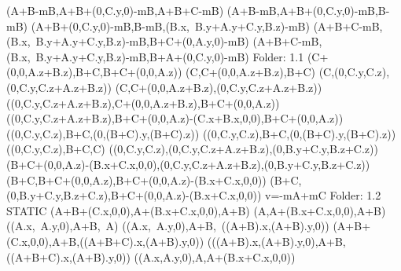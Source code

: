 \left(A+B-mB,A+B+\left(0,C.y,0\right)-mB,A+B+C-mB\right)
\left(A+B-mB,A+B+\left(0,C.y,0\right)-mB,B-mB\right)
\left(A+B+\left(0,C.y,0\right)-mB,B-mB,\left(B.x,\ B.y+A.y+C.y,B.z\right)-mB\right)
\left(A+B+C-mB,\left(B.x,\ B.y+A.y+C.y,B.z\right)-mB,B+C+\left(0,A.y,0\right)-mB\right)
\left(A+B+C-mB,\left(B.x,\ B.y+A.y+C.y,B.z\right)-mB,B+A+\left(0,C.y,0\right)-mB\right)
Folder: 1.1
\left(C+\left(0,0,A.z+B.z\right),B+C,B+C+\left(0,0,A.z\right)\right)
\left(C,C+\left(0,0,A.z+B.z\right),B+C\right)
\left(C,\left(0,C.y,C.z\right),\left(0,C.y,C.z+A.z+B.z\right)\right)
\left(C,C+\left(0,0,A.z+B.z\right),\left(0,C.y,C.z+A.z+B.z\right)\right)
\left(\left(0,C.y,C.z+A.z+B.z\right),C+\left(0,0,A.z+B.z\right),B+C+\left(0,0,A.z\right)\right)
\left(\left(0,C.y,C.z+A.z+B.z\right),B+C+\left(0,0,A.z\right)-\left(C.x+B.x,0,0\right),B+C+\left(0,0,A.z\right)\right)
\left(\left(0,C.y,C.z\right),B+C,\left(0,\left(B+C\right).y,\left(B+C\right).z\right)\right)
\left(\left(0,C.y,C.z\right),B+C,\left(0,\left(B+C\right).y,\left(B+C\right).z\right)\right)
\left(\left(0,C.y,C.z\right),B+C,C\right)
\left(\left(0,C.y,C.z\right),\left(0,C.y,C.z+A.z+B.z\right),\left(0,B.y+C.y,B.z+C.z\right)\right)
\left(B+C+\left(0,0,A.z\right)-\left(B.x+C.x,0,0\right),\left(0,C.y,C.z+A.z+B.z\right),\left(0,B.y+C.y,B.z+C.z\right)\right)
\left(B+C,B+C+\left(0,0,A.z\right),B+C+\left(0,0,A.z\right)-\left(B.x+C.x,0,0\right)\right)
\left(B+C,\left(0,B.y+C.y,B.z+C.z\right),B+C+\left(0,0,A.z\right)-\left(B.x+C.x,0,0\right)\right)
v=-mA+mC
Folder: 1.2 STATIC
\left(A+B+\left(C.x,0,0\right),A+\left(B.x+C.x,0,0\right),A+B\right)
\left(A,A+\left(B.x+C.x,0,0\right),A+B\right)
\left(\left(A.x,\ A.y,0\right),A+B,\ A\right)
\left(\left(A.x,\ A.y,0\right),A+B,\ \left(\left(A+B\right).x,\left(A+B\right).y,0\right)\right)
\left(A+B+\left(C.x,0,0\right),A+B,\left(\left(A+B+C\right).x,\left(A+B\right).y,0\right)\right)
\left(\left(\left(A+B\right).x,\left(A+B\right).y,0\right),A+B,\left(\left(A+B+C\right).x,\left(A+B\right).y,0\right)\right)
\left(\left(A.x,A.y,0\right),A,A+\left(B.x+C.x,0,0\right)\right)
